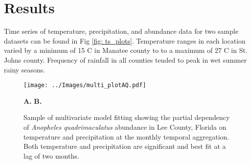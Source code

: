 \section{Results}

Time series of temperature, precipitation, and abundance data for two sample datasets can be found in Fig \ref{fig: ts_plots}. Temperature ranges in each location varied by a minimum of 15 \degree C in Manatee county to to a maximum of 27 \degree C in St. Johns county. Frequency of rainfall in all counties tended to peak in wet summer rainy seasons.  


\begin{figure}[h!]
	\begin{minipage}[]{\textwidth}
		\centering
		\texttt{[image: ../Images/multi\_plotAQ.pdf]}
	\end{minipage}
	\begin{minipage}[]{\textwidth}
		\vspace{.3cm}
		\hspace{5.2cm}\textbf{A.}
		\hspace{7cm}\textbf{B.}
	\end{minipage}
	\caption{Sample of multivariate model fitting  showing the partial dependency of \textit{Anopheles quadrimaculatus} abundance in Lee County, Florida on temperature and precipitation at the monthly temporal aggregation. Both temperature and precipitation are significant and best fit at a lag of two months.}
	\label{fig: multivar}
\end{figure}

